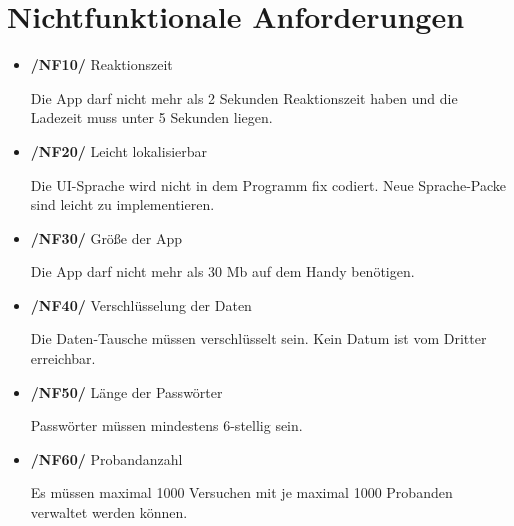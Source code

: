 \documentclass[a4paper]{scrreprt}
\begin{document}
   \chapter{Nichtfunktionale Anforderungen}
        \begin{itemize}
            \item \textbf{/NF10/} Reaktionszeit
                \par Die App darf nicht mehr als 2 Sekunden Reaktionszeit haben und die Ladezeit muss unter 5 Sekunden liegen.

            \item \textbf{/NF20/} Leicht lokalisierbar
                \par Die UI-Sprache wird nicht in dem Programm fix codiert. Neue Sprache-Packe sind leicht zu implementieren.

            \item \textbf{/NF30/} Größe der App
                \par Die App darf nicht mehr als 30 Mb auf dem Handy benötigen.

            \item \textbf{/NF40/} Verschlüsselung der Daten
                \par Die Daten-Tausche müssen verschlüsselt sein. Kein Datum ist vom Dritter erreichbar.

            \item \textbf{/NF50/} Länge der Passwörter
                \par Passwörter müssen mindestens 6-stellig sein.

            \item \textbf{/NF60/} Probandanzahl
            \par Es müssen maximal 1000 Versuchen mit je maximal 1000 Probanden verwaltet werden können.
        \end{itemize}

\end{document}
